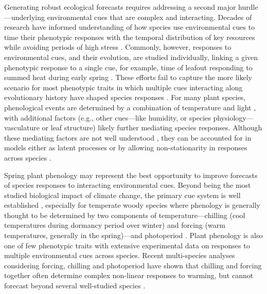 \documentclass[11pt]{article}
\begin{document}
\par Generating robust ecological forecasts requires addressing a second major hurdle---underlying environmental cues that are complex and interacting. Decades of research have informed understanding of how species use environmental cues to time their phenotypic responses with the temporal distribution of key resources while avoiding periods of high stress \citep{larcher1980,bonamour2019}. Commonly, however, responses to environmental cues, and their evolution, are studied individually, linking a given phenotypic response to a single cue, for example, time of leafout responding to summed heat during early spring \citep{davies2013phylogenetic}. These efforts fail to capture the more likely scenario for most phenotypic traits in which multiple cues interacting along evolutionary history have shaped species responses \citep{Ackerly:2009ly}. For many plant species, phenological events are determined by a combination of temperature and light \citep{chuinearees}, with additional factors (e.g., other cues---like humidity, or species physiology---vasculature or leaf structure) likely further mediating species responses. Although these mediating factors are not well understood \citep{chuinearees}, they can be accounted for in models either as latent processes or by allowing non-stationarity in responses across species \citep{davies2019phylogenetically}.  

\par Spring plant phenology may represent the best opportunity to improve forecasts of species responses to interacting environmental cues. Beyond being the most studied biological impact of climate change, the primary cue system is well established \citep{chuinearees}, especially for temperate woody species where phenology is generally thought to be determined by two components of temperature---chilling (cool temperatures during dormancy period over winter) and forcing (warm temperatures, generally in the spring)---and photoperiod \citep{ospreephoto}. Plant phenology is also one of few phenotypic traits with extensive experimental data on responses to multiple environmental cues across species. Recent multi-species analyses considering forcing, chilling and photoperiod have shown that chilling and forcing together often determine complex non-linear responses to warming, but cannot forecast beyond several well-studied species \citep{ettinger2020}. 
\end{document}
